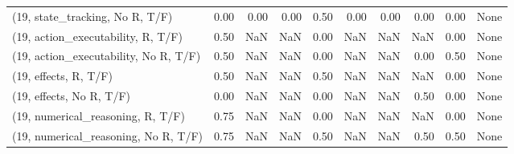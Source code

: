 \begin{table*}[h!]
\begin{adjustbox}{width=2\columnwidth,center}
\begin{tabular}{lrrr|rrr|rrr}
(19, state\_tracking, No R, T/F)       &                      0.00 &                  0.00 &                      0.00 &                          0.50 &                      0.00 &                          0.00 &                                   0.00 &                               0.00 &                                  None \\
(19, action\_executability, R, T/F)    &                      0.50 &                   NaN &                       NaN &                          0.00 &                       NaN &                           NaN &                                    NaN &                               0.00 &                                  None \\
(19, action\_executability, No R, T/F) &                      0.50 &                   NaN &                       NaN &                          0.00 &                       NaN &                           NaN &                                   0.00 &                               0.50 &                                  None \\
(19, effects, R, T/F)                 &                      0.50 &                   NaN &                       NaN &                          0.50 &                       NaN &                           NaN &                                    NaN &                               0.00 &                                  None \\
(19, effects, No R, T/F)              &                      0.00 &                   NaN &                       NaN &                          0.00 &                       NaN &                           NaN &                                   0.50 &                               0.00 &                                  None \\
(19, numerical\_reasoning, R, T/F)     &                      0.75 &                   NaN &                       NaN &                          0.00 &                       NaN &                           NaN &                                    NaN &                               0.00 &                                  None \\
(19, numerical\_reasoning, No R, T/F)  &                      0.75 &                   NaN &                       NaN &                          0.50 &                       NaN &                           NaN &                                   0.50 &                               0.50 &                                  None \\

\end{tabular}
\end{adjustbox}
\end{table*}
